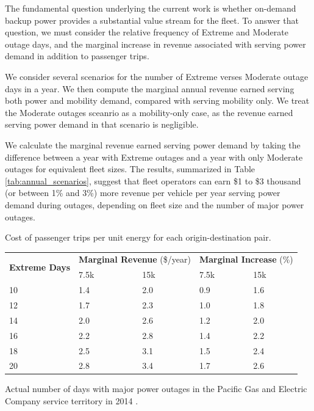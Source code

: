 \documentclass[journal]{IEEEtran}
\begin{document}
The fundamental question underlying the current work is whether on-demand backup power provides a substantial value stream for the fleet. To answer that question, we must consider the relative frequency of Extreme and Moderate outage days, and the marginal increase in revenue associated with serving power demand in addition to passenger trips.

We consider several scenarios for the number of Extreme verses Moderate outage days in a year. We then compute the marginal annual revenue earned serving both power and mobility demand, compared with serving mobility only. We treat the Moderate outages sceanrio as a mobility-only case, as the revenue earned serving power demand in that scenario is negligible. 

We calculate the marginal revenue earned serving power demand by taking the difference between a year with Extreme outages and a year with only Moderate outages for equivalent fleet sizes. The results, summarized in Table \ref{tab:annual_scenarios}, suggest that fleet operators can earn \$1 to \$3 thousand (or between 1\% and 3\%) more revenue per vehicle per year serving power demand during outages, depending on fleet size and the number of major power outages.

\begin{threeparttable}[!htbp]
    \renewcommand{\arraystretch}{1}
    \caption{Cost of passenger trips per unit energy for each origin-destination pair.}
    \label{tab:annual_scenarios}
    \centering
    \def\colmargin{6.75cm}
    \footnotesize{
    \begin{tabular}{p{1cm}p{1cm}p{1cm}p{1cm}p{1cm}}
    \hline
    \multirow{2}{1cm}{\textbf{Extreme Days}} & \multicolumn{2}{c}{\textbf{Marginal Revenue} (\$/year)} & \multicolumn{2}{c}{\textbf{Marginal Increase} (\%)} \\
     & 7.5k & 15k & 7.5k & 15k \\
    \hline
    10 & 1.4 & 2.0 & 0.9 & 1.6 \\
    12 & 1.7 & 2.3 & 1.0 & 1.8 \\
    14 & 2.0 & 2.6 & 1.2 & 2.0 \\
    16\tnote{\textasteriskcentered} & 2.2 & 2.8 & 1.4 & 2.2 \\
    18 & 2.5 & 3.1 & 1.5 & 2.4 \\
    20 & 2.8 & 3.4 & 1.7 & 2.6 \\
    \hline
    \end{tabular}
      \begin{tablenotes}
        \footnotesize
        \item[\textasteriskcentered] Actual number of days with major power outages in the Pacific Gas and Electric Company service territory in 2014 \cite{pge_reliability_2014}.
      \end{tablenotes}}
\end{threeparttable}
\end{document}
